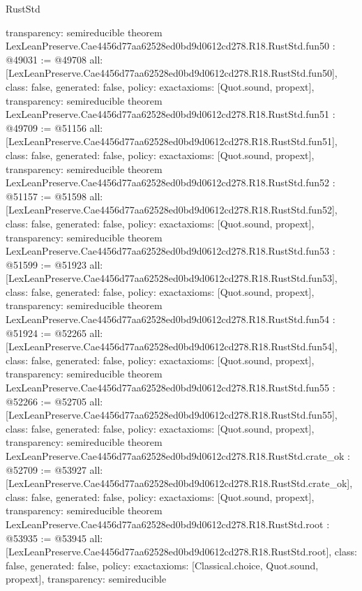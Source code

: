 \begin{lexlean}{RustStd}
\begin{coremodule}
{  transparency: semireducible
}
theorem LexLeanPreserve.Cae4456d77aa62528ed0bd9d0612cd278.R18.RustStd.fun50 : @49031 := @49708 {
  all: [LexLeanPreserve.Cae4456d77aa62528ed0bd9d0612cd278.R18.RustStd.fun50],
  class: false,
  generated: false,
  policy: exact{axioms: [Quot.sound, propext]},
  transparency: semireducible
}
theorem LexLeanPreserve.Cae4456d77aa62528ed0bd9d0612cd278.R18.RustStd.fun51 : @49709 := @51156 {
  all: [LexLeanPreserve.Cae4456d77aa62528ed0bd9d0612cd278.R18.RustStd.fun51],
  class: false,
  generated: false,
  policy: exact{axioms: [Quot.sound, propext]},
  transparency: semireducible
}
theorem LexLeanPreserve.Cae4456d77aa62528ed0bd9d0612cd278.R18.RustStd.fun52 : @51157 := @51598 {
  all: [LexLeanPreserve.Cae4456d77aa62528ed0bd9d0612cd278.R18.RustStd.fun52],
  class: false,
  generated: false,
  policy: exact{axioms: [Quot.sound, propext]},
  transparency: semireducible
}
theorem LexLeanPreserve.Cae4456d77aa62528ed0bd9d0612cd278.R18.RustStd.fun53 : @51599 := @51923 {
  all: [LexLeanPreserve.Cae4456d77aa62528ed0bd9d0612cd278.R18.RustStd.fun53],
  class: false,
  generated: false,
  policy: exact{axioms: [Quot.sound, propext]},
  transparency: semireducible
}
theorem LexLeanPreserve.Cae4456d77aa62528ed0bd9d0612cd278.R18.RustStd.fun54 : @51924 := @52265 {
  all: [LexLeanPreserve.Cae4456d77aa62528ed0bd9d0612cd278.R18.RustStd.fun54],
  class: false,
  generated: false,
  policy: exact{axioms: [Quot.sound, propext]},
  transparency: semireducible
}
theorem LexLeanPreserve.Cae4456d77aa62528ed0bd9d0612cd278.R18.RustStd.fun55 : @52266 := @52705 {
  all: [LexLeanPreserve.Cae4456d77aa62528ed0bd9d0612cd278.R18.RustStd.fun55],
  class: false,
  generated: false,
  policy: exact{axioms: [Quot.sound, propext]},
  transparency: semireducible
}
theorem LexLeanPreserve.Cae4456d77aa62528ed0bd9d0612cd278.R18.RustStd.crate_ok : @52709 := @53927 {
  all: [LexLeanPreserve.Cae4456d77aa62528ed0bd9d0612cd278.R18.RustStd.crate_ok],
  class: false,
  generated: false,
  policy: exact{axioms: [Quot.sound, propext]},
  transparency: semireducible
}
theorem LexLeanPreserve.Cae4456d77aa62528ed0bd9d0612cd278.R18.RustStd.root : @53935 := @53945 {
  all: [LexLeanPreserve.Cae4456d77aa62528ed0bd9d0612cd278.R18.RustStd.root],
  class: false,
  generated: false,
  policy: exact{axioms: [Classical.choice, Quot.sound, propext]},
  transparency: semireducible
}


\end{coremodule}
\end{lexlean}
